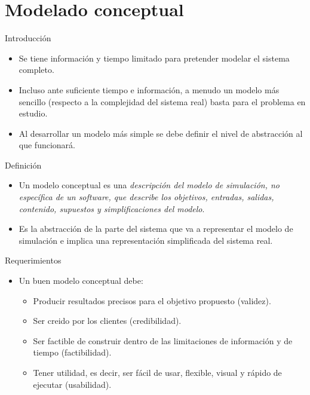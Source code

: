 \section{Modelado conceptual}

\begin{frame}{Introducción}
    \begin{itemize}
        \item Se tiene información y tiempo limitado para pretender modelar el sistema completo.
	    \item Incluso ante suficiente tiempo e información, a menudo un modelo más sencillo (respecto a la complejidad del sistema real) basta para el problema en estudio.
	    \item Al desarrollar un modelo más simple se debe definir el nivel de abstracción al que funcionará.
    \end{itemize}
\end{frame}

\begin{frame}{Definición}
    \begin{itemize}
        \item Un modelo conceptual es una \textit{descripción del modelo de simulación, no específica de un software, que describe los objetivos, entradas, salidas, contenido, supuestos y simplificaciones del modelo}.
        \item Es la abstracción de la parte del sistema que va a representar el modelo de simulación e implica una representación simplificada del sistema real.
    \end{itemize}
\end{frame}

\begin{frame}{Requerimientos}
    \begin{itemize}
        \item Un buen modelo conceptual debe:
        \begin{itemize}
        \item Producir resultados precisos para el objetivo propuesto (validez).
        \item Ser creido por los clientes (credibilidad).
        \item Ser factible de construir dentro de las limitaciones de información y de tiempo (factibilidad).
        \item Tener utilidad, es decir, ser fácil de usar, flexible, visual y rápido de ejecutar (usabilidad).
        \end{itemize}
    \end{itemize}
\end{frame}

